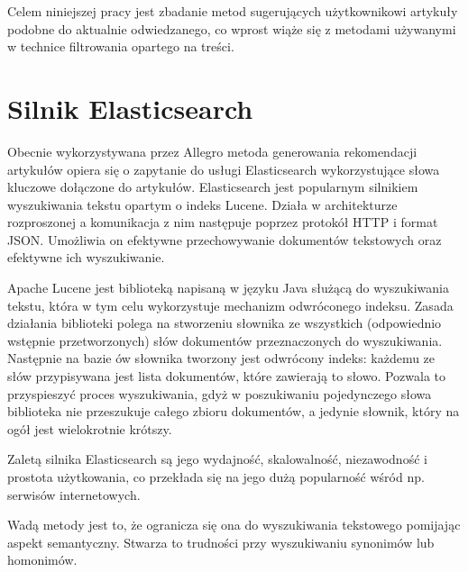 \documentclass[pl]{minipw} %
\begin{document}
Celem niniejszej pracy jest zbadanie metod sugerujących użytkownikowi artykuły podobne do aktualnie odwiedzanego, co wprost wiąże się z metodami używanymi w technice filtrowania opartego na treści.

\section{Silnik Elasticsearch}

Obecnie wykorzystywana przez Allegro metoda generowania rekomendacji artykułów opiera się o zapytanie do usługi Elasticsearch\cite{elastic} wykorzystujące słowa kluczowe dołączone do artykułów. Elasticsearch jest popularnym silnikiem wyszukiwania tekstu opartym o indeks Lucene\cite{lucene}. Działa w architekturze rozproszonej a komunikacja z nim następuje poprzez protokół HTTP i format JSON. Umożliwia on efektywne przechowywanie dokumentów tekstowych oraz efektywne ich wyszukiwanie. 

Apache Lucene jest biblioteką napisaną w języku Java służącą do wyszukiwania tekstu, która w tym celu wykorzystuje mechanizm odwróconego indeksu. Zasada działania biblioteki polega na stworzeniu słownika ze wszystkich (odpowiednio wstępnie przetworzonych) słów dokumentów przeznaczonych do wyszukiwania. Następnie na bazie ów słownika tworzony jest odwrócony indeks: każdemu ze słów przypisywana jest lista dokumentów, które zawierają to słowo. Pozwala to przyspieszyć proces wyszukiwania, gdyż w poszukiwaniu pojedynczego słowa biblioteka nie przeszukuje całego zbioru dokumentów, a jedynie słownik, który na ogół jest wielokrotnie krótszy.

Zaletą silnika Elasticsearch są jego wydajność, skalowalność, niezawodność i prostota użytkowania, co przekłada się na jego dużą popularność wśród np. serwisów internetowych\cite{elastic_companies}.

Wadą metody jest to, że ogranicza się ona do wyszukiwania tekstowego pomijając aspekt semantyczny. Stwarza to trudności przy wyszukiwaniu synonimów lub homonimów.%
\end{document}
